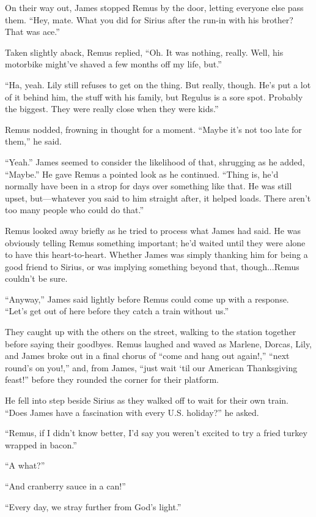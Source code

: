 On their way out, James stopped Remus by the door, letting everyone else pass them. “Hey, mate. What you did for Sirius after the run-in with his brother? That was ace.”

Taken slightly aback, Remus replied, “Oh. It was nothing, really. Well, his motorbike might’ve shaved a few months off my life, but.”

“Ha, yeah. Lily still refuses to get on the thing. But really, though. He’s put a lot of it behind him, the stuff with his family, but Regulus is a sore spot. Probably the biggest. They were really close when they were kids.”

Remus nodded, frowning in thought for a moment. “Maybe it’s not too late for them,” he said.

“Yeah.” James seemed to consider the likelihood of that, shrugging as he added, “Maybe.” He gave Remus a pointed look as he continued. “Thing is, he’d normally have been in a strop for days over something like that. He was still upset, but—whatever you said to him straight after, it helped loads. There aren’t too many people who could do that.”

Remus looked away briefly as he tried to process what James had said. He was obviously telling Remus something important; he’d waited until they were alone to have this heart-to-heart. Whether James was simply thanking him for being a good friend to Sirius, or was implying something beyond that, though...Remus couldn’t be sure.

“Anyway,” James said lightly before Remus could come up with a response. “Let’s get out of here before they catch a train without us.”

They caught up with the others on the street, walking to the station together before saying their goodbyes. Remus laughed and waved as Marlene, Dorcas, Lily, and James broke out in a final chorus of “come and hang out again!,” “next round’s on you!,” and, from James, “just wait ‘til our American Thanksgiving feast!” before they rounded the corner for their platform.

He fell into step beside Sirius as they walked off to wait for their own train. “Does James have a fascination with every U.S. holiday?” he asked.

“Remus, if I didn’t know better, I’d say you weren’t excited to try a fried turkey wrapped in bacon.”

“A what?”

“And cranberry sauce in a can!”

“Every day, we stray further from God’s light.”

